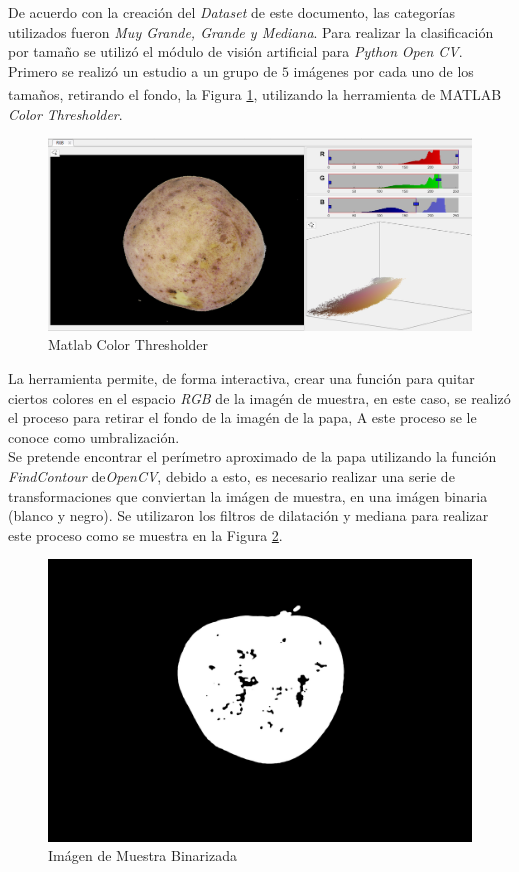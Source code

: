 	De acuerdo con la creación del \textit{Dataset} de este documento, las categorías utilizados fueron \textit{Muy Grande, Grande y Mediana}. Para realizar la clasificación por tamaño se utilizó el módulo de visión artificial para \textit{Python} \textit{Open CV}. Primero se realizó un estudio a un grupo de $5$ imágenes por cada uno de los tamaños, retirando el fondo, la Figura \ref{fig:matlabcv}, utilizando la herramienta de MATLAB\textsuperscript{\textregistered} \textit{Color Thresholder}.
	
				
	\begin{figure}[ht]
		\centering
		\includegraphics[scale=0.3]{Figs/matlabcv.png}
		\caption{Matlab Color Thresholder}
		\label{fig:matlabcv}
	\end{figure}
	
	La herramienta permite, de forma interactiva, crear una función para quitar ciertos colores en el espacio \textit{RGB} de la imagén de muestra, en este caso, se realizó el proceso para retirar el fondo de la imagén de la papa, A este proceso se le conoce como umbralización. \\
	
	Se pretende encontrar el perímetro aproximado de la papa utilizando la función \textit{FindContour} de\textit{OpenCV}, debido a esto, es necesario realizar una serie de transformaciones que conviertan la imágen de muestra, en una imágen binaria (blanco y negro). Se utilizaron los filtros de dilatación y mediana para realizar este proceso como se muestra en la Figura \ref{fig:dilmed}.	
					
	\begin{figure}[ht]
		\centering
		\includegraphics[scale=0.05]{Figs/dilmed.png}
		\caption{Imágen de Muestra Binarizada}
		\label{fig:dilmed}
	\end{figure}

